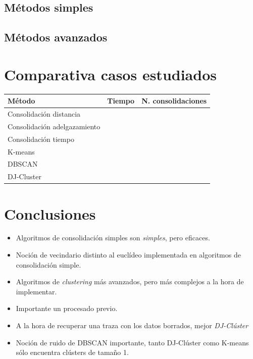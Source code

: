 \documentclass[10pt, spanish]{beamer}
\begin{document}
\subsection{M\'etodos simples}
\begin{frame}

\end{frame}

\subsection{M\'etodos avanzados}
\begin{frame}

\end{frame}


\section{Comparativa casos estudiados}

\begin{frame}
\begin{tabular}{|l|l|l|}
	\hline
	M\'etodo & Tiempo & N. consolidaciones \\
	\hline
	Consolidaci\'on distancia &  & \\
	\hline
	Consolidaci\'on adelgazamiento &  & \\
	\hline
	Consolidaci\'on tiempo &  & \\
	\hline
	K-means &  & \\
	\hline
	DBSCAN &  & \\
	\hline
	DJ-Cluster &  & \\
\end{tabular}
\end{frame}

\section{Conclusiones}
\begin{frame}
\begin{itemize}[<+- | alert@+>]
	\item Algoritmos de consolidaci\'on simples son \textit{simples}, pero eficaces.
	\item Noci\'on de vecindario distinto al eucl\'ideo implementada en algoritmos de consolidaci\'on simple.
	\item Algoritmos de \textit{clustering} m\'as avanzados, pero m\'as complejos a la hora de implementar.
	\item Importante un procesado previo.
	\item A la hora de recuperar una traza con los datos borrados, mejor \textit{DJ-Cl\'uster}
	\item Noci\'on de ruido de DBSCAN importante, tanto DJ-Cl\'uster como K-means s\'olo encuentra cl\'usters de tama\~no 1.
\end{itemize}
\end{frame}
\end{document}
